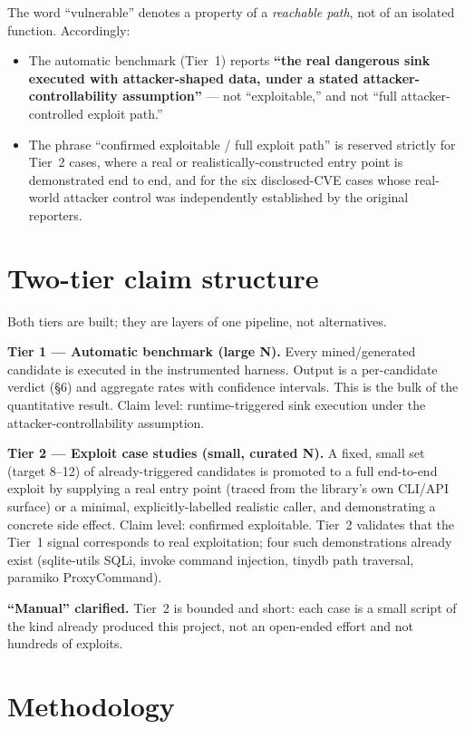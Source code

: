 \documentclass[11pt]{article}
\begin{document}
The word ``vulnerable'' denotes a property of a \emph{reachable path}, not
of an isolated function. Accordingly:

\begin{itemize}[leftmargin=1.4em,itemsep=1pt,topsep=2pt]
  \item The automatic benchmark (Tier~1) reports \textbf{``the real
  dangerous sink executed with attacker-shaped data, under a stated
  attacker-controllability assumption''} --- not ``exploitable,'' and not
  ``full attacker-controlled exploit path.''
  \item The phrase ``confirmed exploitable / full exploit path'' is reserved
  strictly for Tier~2 cases, where a real or realistically-constructed entry
  point is demonstrated end to end, and for the six disclosed-CVE cases
  whose real-world attacker control was independently established by the
  original reporters.
\end{itemize}

\section{Two-tier claim structure}

Both tiers are built; they are layers of one pipeline, not alternatives.

\textbf{Tier 1 --- Automatic benchmark (large N).} Every mined/generated
candidate is executed in the instrumented harness. Output is a per-candidate
verdict (\S6) and aggregate rates with confidence intervals. This is the
bulk of the quantitative result. Claim level: runtime-triggered sink
execution under the attacker-controllability assumption.

\textbf{Tier 2 --- Exploit case studies (small, curated N).} A fixed,
small set (target 8--12) of already-triggered candidates is promoted to a
full end-to-end exploit by supplying a real entry point (traced from the
library's own CLI/API surface) or a minimal, explicitly-labelled realistic
caller, and demonstrating a concrete side effect. Claim level: confirmed
exploitable. Tier~2 validates that the Tier~1 signal corresponds to real
exploitation; four such demonstrations already exist (sqlite-utils SQLi,
invoke command injection, tinydb path traversal, paramiko ProxyCommand).

\textbf{``Manual'' clarified.} Tier~2 is bounded and short: each case is a
small script of the kind already produced this project, not an open-ended
effort and not hundreds of exploits.

\section{Methodology}
\end{document}
